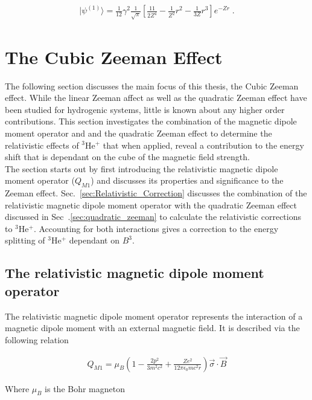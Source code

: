         \begin{align}
            \vert \psi^{(1)} \rangle = \frac{1}{12}\gamma^2 \frac{1}{\sqrt{\pi}} \left[\frac{11}{2 Z^4} - \frac{1}{Z^2} r^2 -\frac{1}{3Z} r^3 \right] e^{-Zr} \;.
        \end{align}



    \section{The Cubic Zeeman Effect}
        The following section discusses the main focus of this thesis, the Cubic Zeeman effect. While the linear Zeeman affect as well as the quadratic Zeeman effect have been studied for hydrogenic systems, little is known about any higher order contributions. This section investigates the combination of the magnetic dipole moment operator and and the quadratic Zeeman effect to determine the relativistic effects of $^3$He$^+$ that when applied, reveal a contribution to the energy shift that is dependant on the cube of the magnetic field strength.\\

        The section starts out by first introducing the relativistic magnetic dipole moment operator ($Q_{M1}$) and discusses its properties and significance to the Zeeman effect. Sec.~\ref{sec:Relativistic_Correction} discusses the combination of the relativistic magnetic dipole moment operator with the quadratic Zeeman effect discussed in Sec~.\ref{sec:quadratic_zeeman} to calculate the relativistic corrections to $^3$He$^+$. Accounting for both interactions gives a correction to the energy splitting of $^3$He$^+$ dependant on $B^3$.

        \subsection{The relativistic magnetic dipole moment operator}\label{sec:magnetic_dipole_operator}
            The relativistic magnetic dipole moment operator represents the interaction of a magnetic dipole moment with an external magnetic field. It is described via the following relation

            \begin{align}
                Q_{M1} = \mu_B \left( 1 - \frac{2p^2}{3m^2 c^2} + \frac{Ze^2}{12\pi \epsilon_0 mc^2r} \right) \vec{\sigma} \cdot \vec{B}
            \end{align}

            \noindent Where $\mu_B$ is the Bohr magneton
            
